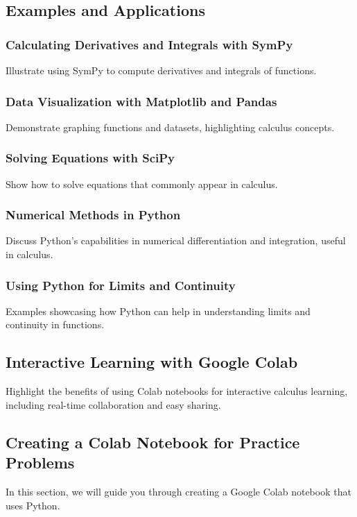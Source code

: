 \documentclass[a4paper,12pt]{book}
\begin{document}
\subsection*{Examples and Applications}

\subsubsection*{Calculating Derivatives and Integrals with SymPy}
Illustrate using SymPy to compute derivatives and integrals of functions.

\subsubsection*{Data Visualization with Matplotlib and Pandas}
Demonstrate graphing functions and datasets, highlighting calculus concepts.

\subsubsection*{Solving Equations with SciPy}
Show how to solve equations that commonly appear in calculus.

\subsubsection*{Numerical Methods in Python}
Discuss Python's capabilities in numerical differentiation and integration, useful in calculus.

\subsubsection*{Using Python for Limits and Continuity}
Examples showcasing how Python can help in understanding limits and continuity in functions.

\subsection*{Interactive Learning with Google Colab}
Highlight the benefits of using Colab notebooks for interactive calculus learning, including real-time collaboration and easy sharing.

\subsection*{Creating a Colab Notebook for Practice Problems}

In this section, we will guide you through creating a Google Colab notebook that uses Python.
\end{document}
